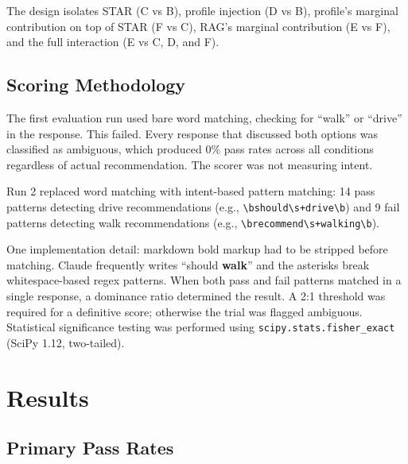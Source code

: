 \documentclass[11pt]{article}
\begin{document}
The design isolates STAR (C vs B), profile injection (D vs B), profile's marginal contribution on top of STAR (F vs C), RAG's marginal contribution (E vs F), and the full interaction (E vs C, D, and F).

\subsection{Scoring Methodology}

The first evaluation run used bare word matching, checking for ``walk'' or ``drive'' in the response. This failed. Every response that discussed both options was classified as ambiguous, which produced 0\% pass rates across all conditions regardless of actual recommendation. The scorer was not measuring intent.

Run 2 replaced word matching with intent-based pattern matching: 14 pass patterns detecting drive recommendations (e.g., \texttt{\textbackslash bshould\textbackslash s+drive\textbackslash b}) and 9 fail patterns detecting walk recommendations (e.g., \texttt{\textbackslash brecommend\textbackslash s+walking\textbackslash b}).

One implementation detail: markdown bold markup had to be stripped before matching. Claude frequently writes ``should \textbf{walk}'' and the asterisks break whitespace-based regex patterns. When both pass and fail patterns matched in a single response, a dominance ratio determined the result. A 2:1 threshold was required for a definitive score; otherwise the trial was flagged ambiguous. Statistical significance testing was performed using \texttt{scipy.stats.fisher\_exact} (SciPy 1.12, two-tailed).

\section{Results}

\subsection{Primary Pass Rates}
\end{document}

